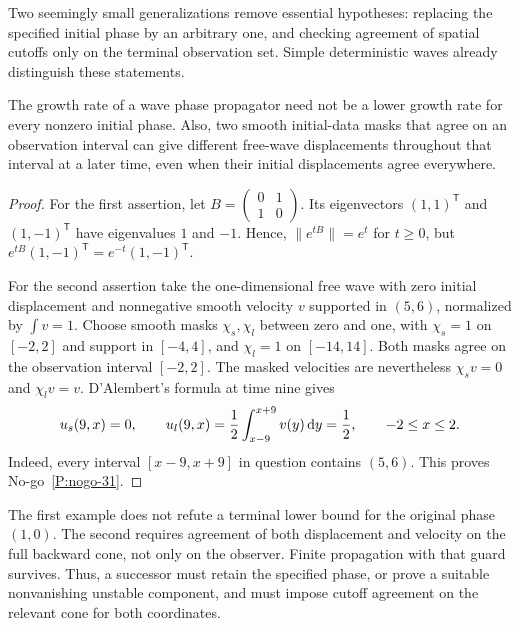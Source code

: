 Two seemingly small generalizations remove essential hypotheses: replacing
the specified initial phase by an arbitrary one, and checking agreement
of spatial cutoffs only on the terminal observation set. Simple
deterministic waves already distinguish these statements.

\setcounter{nogo}{30}
\begin{nogo}
  \label{P:nogo-31}
  The growth rate of a wave phase propagator need not be a lower growth
  rate for every nonzero initial phase. Also, two smooth initial-data
  masks that agree on an observation interval can give different free-wave
  displacements throughout that interval at a later time, even when their
  initial displacements agree everywhere.
\end{nogo}
\begin{proof}
  For the first assertion, let
  $B=\left(\begin{smallmatrix}0&1\\1&0\end{smallmatrix}\right)$.
  Its eigenvectors $(1,1)^{\mathsf T}$ and $(1,-1)^{\mathsf T}$ have
  eigenvalues $1$ and $-1$. Hence, $\|e^{tB}\|=e^t$ for $t\ge0$,
  but $e^{tB}(1,-1)^{\mathsf T}=e^{-t}(1,-1)^{\mathsf T}$.

  For the second assertion take the one-dimensional free wave with zero
  initial displacement and nonnegative smooth velocity $v$ supported in
  $(5,6)$, normalized by $\int v=1$. Choose smooth masks $\chi_s,\chi_l$
  between zero and one, with $\chi_s=1$ on $[-2,2]$ and support in
  $[-4,4]$, and $\chi_l=1$ on $[-14,14]$. Both masks agree on the
  observation interval $[-2,2]$. The masked velocities are nevertheless
  $\chi_sv=0$ and $\chi_lv=v$. D'Alembert's formula at time nine gives
  \[
    u_s(9,x)=0,\qquad
    u_l(9,x)=\frac12\int_{x-9}^{x+9}v(y)\,\mathrm{d} y=\frac12,
    \qquad -2\le x\le2.
  \]
  Indeed, every interval $[x-9,x+9]$ in question contains $(5,6)$.
  This proves No-go~\ref{P:nogo-31}.
\end{proof}

The first example does not refute a terminal lower bound for the original
phase $(1,0)$. The second requires agreement of both displacement and
velocity on the full backward cone, not only on the observer. Finite
propagation with that guard survives. Thus, a successor must retain the
specified phase, or prove a suitable nonvanishing unstable component, and
must impose cutoff agreement on the relevant cone for both coordinates.

